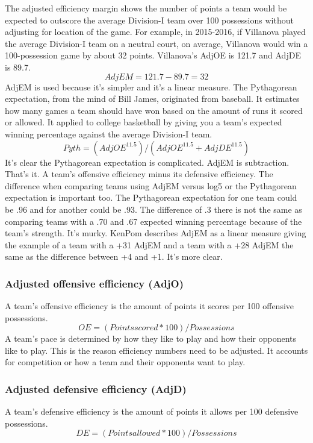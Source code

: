 \documentclass[
10pt, %
a4paper, %
oneside, %
headinclude,footinclude, %
BCOR5mm, %
]{scrartcl}
\begin{document}
The adjusted efficiency margin shows the number of points a team would be expected to outscore the average Division-I team over 100 possessions without adjusting for location of the game.
For example, in 2015-2016, if Villanova played the average Division-I team on a neutral court, on average, Villanova would win a 100-possession game by about 32 points.
Villanova's AdjOE is 121.7 and AdjDE is 89.7.\[AdjEM = 121.7 - 89.7 = 32\] AdjEM is used because it's simpler and it's a linear measure.
The Pythagorean expectation, from the mind of Bill James, originated from baseball. It estimates how many games a team should have won based on the amount of runs it scored or allowed.
It applied to college basketball by giving you a team's expected winning percentage against the average Division-I team.\[Pyth = (AdjOE^{11.5}) / (AdjOE^{11.5} + AdjDE^{11.5})\]
It's clear the Pythagorean expectation is complicated. AdjEM is subtraction. That's it. A team's offensive efficiency minus its defensive efficiency.
The difference when comparing teams using AdjEM versus log5 or the Pythagorean expectation is important too. The Pythagorean expectation for one team could be .96 and for another could be .93. The difference of .3 there is not the same as comparing teams with a .70 and .67 expected winning percentage because of the team's strength. It's murky.
KenPom describes AdjEM as a linear measure giving the example of a team with a +31 AdjEM and a team with a +28 AdjEM the same as the difference between +4 and +1. It's more clear.\cite{adjem}

\subsubsection{Adjusted offensive efficiency (AdjO)}
A team's offensive efficiency is the amount of points it scores per 100 offensive possessions.
\[OE = (Points scored * 100) / Possessions\]
A team's pace is determined by how they like to play and how their opponents like to play. This is the reason efficiency numbers need to be adjusted. It accounts for competition or how a team and their opponents want to play.

\subsubsection{Adjusted defensive efficiency (AdjD)}
A team's defensive efficiency is the amount of points it allows per 100 defensive possessions.
\[DE = (Points allowed * 100) / Possessions\]
\end{document}
